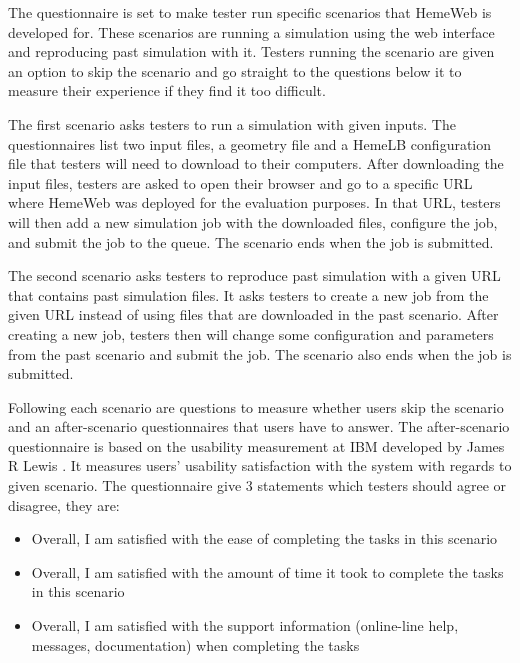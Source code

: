 The questionnaire is set to make tester run specific scenarios that HemeWeb is developed for. These scenarios are running a simulation using the web interface and reproducing past simulation with it. Testers running the scenario are given an option to skip the scenario and go straight to the questions below it to measure their experience if they find it too difficult. 

The first scenario asks testers to run a simulation with given inputs. The questionnaires list two input files, a geometry file and a HemeLB configuration file that testers will need to download to their computers. After downloading the input files, testers are asked to open their browser and go to a specific URL where HemeWeb was deployed for the evaluation purposes. In that URL, testers will then add a new simulation job with the downloaded files, configure the job, and submit the job to the queue. The scenario ends when the job is submitted.

The second scenario asks testers to reproduce past simulation with a given URL that contains past simulation files. It asks testers to create a new job from the given URL instead of using files that are downloaded in the past scenario. After creating a new job, testers then will change some configuration and parameters from the past scenario and submit the job. The scenario also ends when the job is submitted.

Following each scenario are questions to measure whether users skip the scenario and an after-scenario questionnaires that users have to answer. The after-scenario questionnaire is based on the usability measurement at IBM developed by James R Lewis \citep{lewis1995ibm}.  It measures users' usability satisfaction with the system with regards to given scenario. The questionnaire give 3 statements which testers should agree or disagree, they are:

\begin{itemize}
	\item Overall, I am satisfied with the ease of completing the tasks in this scenario
	\item Overall, I am satisfied with the amount of time it took to complete the tasks in this scenario
	\item Overall, I am satisfied with the support information (online-line help, messages, documentation) when completing the tasks
\end{itemize}


